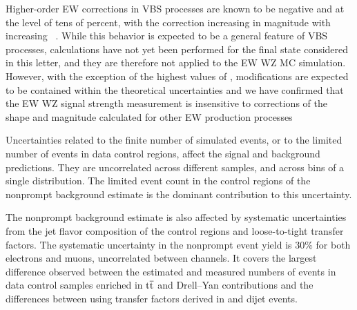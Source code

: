 Higher-order EW corrections in VBS processes are known to be negative and at
the level of tens of percent, with the correction increasing in magnitude 
with increasing {\mjj}~\cite{Biedermann:2016yds}.
While this behavior is expected to be a general feature of VBS processes, 
calculations have not yet been performed for the final state considered 
in this letter, and they are therefore not applied to the EW WZ MC simulation. 
However, with the exception of the highest values of {\mjj}, modifications 
are expected to be contained within the theoretical uncertainties and 
we have confirmed that the EW WZ signal strength measurement is 
insensitive to corrections of the shape and magnitude calculated for 
other EW production processes

Uncertainties related to the finite number of simulated events, or to the limited 
number of events in data control regions, affect the signal and background predictions. 
They are uncorrelated 
across different samples, and across bins of a single distribution. 
The limited event count in the control regions of the
nonprompt background estimate is the dominant contribution to this uncertainty.

The nonprompt background estimate is also affected by systematic uncertainties
from the jet flavor composition of the control regions and loose-to-tight transfer factors.
The systematic uncertainty in the nonprompt event yield is 30\%
for both electrons and muons, uncorrelated between channels.
It covers the largest difference observed
between the estimated and measured
numbers of events in data control samples enriched in
${\mathrm{t}\overline{\mathrm{t}}}$ and Drell--Yan contributions and the differences between 
using transfer factors derived in \Zpj and dijet events.


